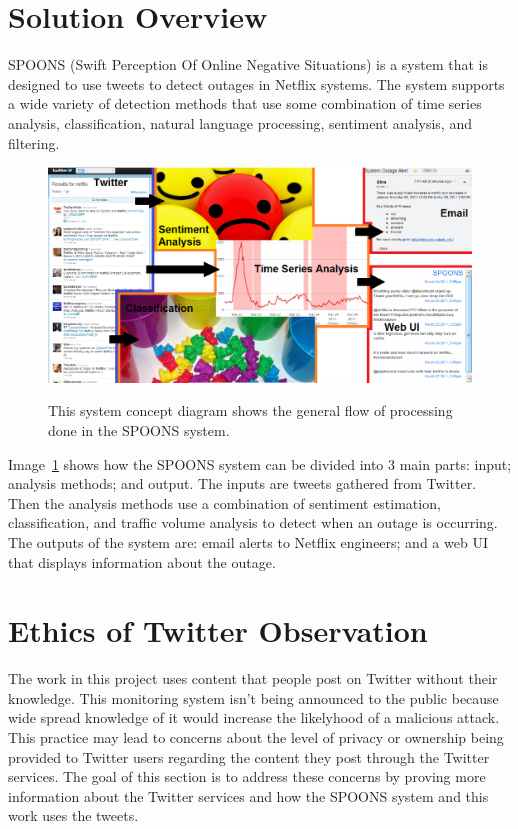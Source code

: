 \documentclass[12pt]{ucthesis}
\newcommand{\captionfonts}{\small\bf\ssp}
\begin{document}
\section{Solution Overview}
\label{overview}

SPOONS (Swift Perception Of Online Negative Situations) is a system that is
designed to use tweets to detect outages in Netflix systems. The system
supports a wide variety of detection methods that use some combination of time
series analysis, classification, natural language processing, sentiment
analysis, and filtering.

\begin{figure}
   \begin{center}
      \includegraphics[width=140mm]{images/systemFlow.eps}
      \captionfonts
      \caption[System Concept Diagram]{This system concept diagram shows the general
                                       flow of processing done in the SPOONS system.}
      \label{fig:systemFlow}
   \end{center}
\end{figure}

Image~\ref{fig:systemFlow} shows how the SPOONS system can be divided into 3
main parts: {\color{blue}input}; {\color{orange}analysis methods}; and
{\color{red}output}. The inputs are tweets gathered from Twitter. Then the
analysis methods use a combination of sentiment estimation, classification, and
traffic volume analysis to detect when an outage is occurring.
The outputs of the system are: email alerts to Netflix engineers; and a web UI that displays
information about the outage.

\section{Ethics of Twitter Observation}

The work in this project uses content that people post on Twitter without their
knowledge. This monitoring system isn't being announced to the
public because wide spread knowledge of it would increase the likelyhood of a
malicious attack. This practice may lead to concerns about the level of privacy
or ownership being provided to Twitter users regarding the content they post
through the Twitter services. The goal of this section is to address these
concerns by proving more information about the Twitter services and how the
SPOONS system and this work uses the tweets.
\end{document}
